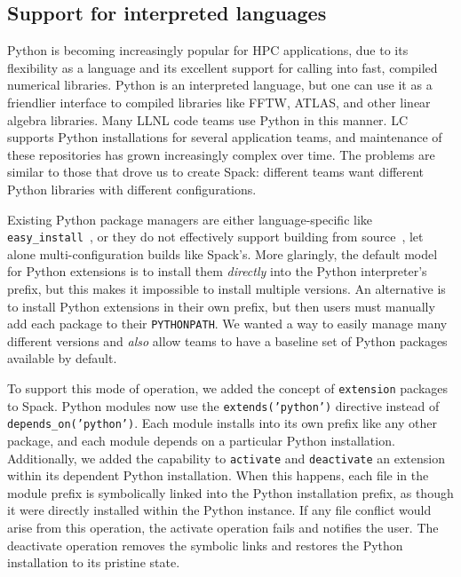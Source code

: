 
\subsection{Support for interpreted languages}
\label{sec:usecase-python}

Python is becoming increasingly popular for HPC applications, 
due to its flexibility as a language and its excellent support
for calling into fast, compiled numerical libraries.
Python is an interpreted language, but one can use it
as a friendlier interface to compiled libraries like FFTW, ATLAS, and
other linear algebra libraries.  Many LLNL code teams use Python in this manner.
%
LC supports Python installations for several application teams,
and maintenance of these repositories has grown increasingly complex over
time.  The problems are similar to those that drove us to create
Spack: different teams want different Python libraries with different
configurations.

Existing Python package managers are either language-specific like 
{\tt easy\_install}~\cite{eby:setuptools}, 
or they do not effectively support building from source~\cite{anaconda,conda}, let
alone multi-configuration builds like Spack's.  More glaringly, the default
model for Python extensions is to install them {\it directly} into the Python
interpreter's prefix, but this makes it impossible to install multiple versions.
An alternative is to install Python extensions in their own prefix,
but then users must manually add each package to their {\tt PYTHONPATH}. 
We wanted a way to  easily manage many different versions and {\it also} allow teams
to have a baseline set of Python packages available by default.

To support this mode of operation, we added the concept of {\tt extension} packages
to Spack. Python modules now use the {\tt extends('python')} directive instead of
{\tt depends\_on('python')}.
Each module installs into its own prefix like any other package,
and each module depends on a particular Python installation.
Additionally, we added the capability to {\tt activate} and {\tt deactivate} an
extension within its dependent Python installation.  When this happens, each file
in the module prefix is symbolically linked into the Python installation prefix, as though it were
directly installed within the Python instance. If any file conflict would arise from this operation,
the activate operation fails and notifies the user.
The deactivate operation removes the symbolic links and restores the Python installation to its 
pristine state. 

